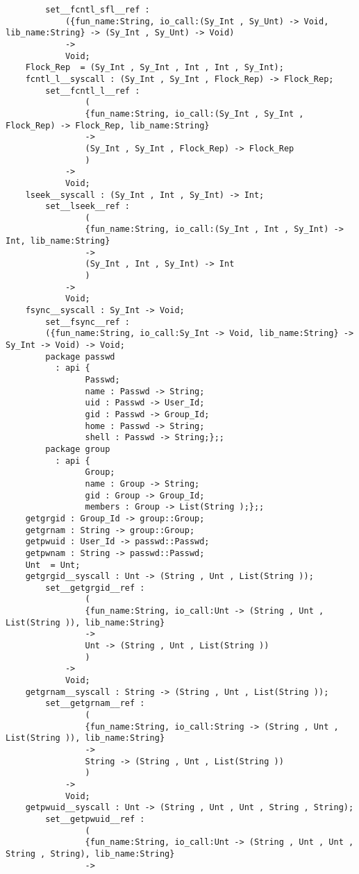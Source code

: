 \begin{verbatim}
        set__fcntl_sfl__ref :
            ({fun_name:String, io_call:(Sy_Int , Sy_Unt) -> Void, lib_name:String} -> (Sy_Int , Sy_Unt) -> Void)
            ->
            Void;
    Flock_Rep  = (Sy_Int , Sy_Int , Int , Int , Sy_Int);
    fcntl_l__syscall : (Sy_Int , Sy_Int , Flock_Rep) -> Flock_Rep;
        set__fcntl_l__ref :
                (
                {fun_name:String, io_call:(Sy_Int , Sy_Int , Flock_Rep) -> Flock_Rep, lib_name:String}
                ->
                (Sy_Int , Sy_Int , Flock_Rep) -> Flock_Rep
                )
            ->
            Void;
    lseek__syscall : (Sy_Int , Int , Sy_Int) -> Int;
        set__lseek__ref :
                (
                {fun_name:String, io_call:(Sy_Int , Int , Sy_Int) -> Int, lib_name:String}
                ->
                (Sy_Int , Int , Sy_Int) -> Int
                )
            ->
            Void;
    fsync__syscall : Sy_Int -> Void;
        set__fsync__ref :
        ({fun_name:String, io_call:Sy_Int -> Void, lib_name:String} -> Sy_Int -> Void) -> Void;
        package passwd
          : api {
                Passwd;
                name : Passwd -> String;
                uid : Passwd -> User_Id;
                gid : Passwd -> Group_Id;
                home : Passwd -> String;
                shell : Passwd -> String;};;
        package group
          : api {
                Group;
                name : Group -> String;
                gid : Group -> Group_Id;
                members : Group -> List(String );};;
    getgrgid : Group_Id -> group::Group;
    getgrnam : String -> group::Group;
    getpwuid : User_Id -> passwd::Passwd;
    getpwnam : String -> passwd::Passwd;
    Unt  = Unt;
    getgrgid__syscall : Unt -> (String , Unt , List(String ));
        set__getgrgid__ref :
                (
                {fun_name:String, io_call:Unt -> (String , Unt , List(String )), lib_name:String}
                ->
                Unt -> (String , Unt , List(String ))
                )
            ->
            Void;
    getgrnam__syscall : String -> (String , Unt , List(String ));
        set__getgrnam__ref :
                (
                {fun_name:String, io_call:String -> (String , Unt , List(String )), lib_name:String}
                ->
                String -> (String , Unt , List(String ))
                )
            ->
            Void;
    getpwuid__syscall : Unt -> (String , Unt , Unt , String , String);
        set__getpwuid__ref :
                (
                {fun_name:String, io_call:Unt -> (String , Unt , Unt , String , String), lib_name:String}
                ->

\end{verbatim}
